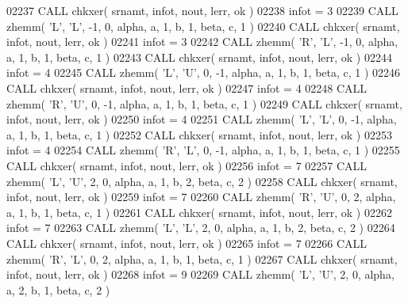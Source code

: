 \begin{DoxyCode}
02237       \textcolor{keyword}{CALL }chkxer( srnamt, infot, nout, lerr, ok )
02238       infot = 3
02239       \textcolor{keyword}{CALL }zhemm( \textcolor{stringliteral}{'L'}, \textcolor{stringliteral}{'L'}, -1, 0, alpha, a, 1, b, 1, beta, c, 1 )
02240       \textcolor{keyword}{CALL }chkxer( srnamt, infot, nout, lerr, ok )
02241       infot = 3
02242       \textcolor{keyword}{CALL }zhemm( \textcolor{stringliteral}{'R'}, \textcolor{stringliteral}{'L'}, -1, 0, alpha, a, 1, b, 1, beta, c, 1 )
02243       \textcolor{keyword}{CALL }chkxer( srnamt, infot, nout, lerr, ok )
02244       infot = 4
02245       \textcolor{keyword}{CALL }zhemm( \textcolor{stringliteral}{'L'}, \textcolor{stringliteral}{'U'}, 0, -1, alpha, a, 1, b, 1, beta, c, 1 )
02246       \textcolor{keyword}{CALL }chkxer( srnamt, infot, nout, lerr, ok )
02247       infot = 4
02248       \textcolor{keyword}{CALL }zhemm( \textcolor{stringliteral}{'R'}, \textcolor{stringliteral}{'U'}, 0, -1, alpha, a, 1, b, 1, beta, c, 1 )
02249       \textcolor{keyword}{CALL }chkxer( srnamt, infot, nout, lerr, ok )
02250       infot = 4
02251       \textcolor{keyword}{CALL }zhemm( \textcolor{stringliteral}{'L'}, \textcolor{stringliteral}{'L'}, 0, -1, alpha, a, 1, b, 1, beta, c, 1 )
02252       \textcolor{keyword}{CALL }chkxer( srnamt, infot, nout, lerr, ok )
02253       infot = 4
02254       \textcolor{keyword}{CALL }zhemm( \textcolor{stringliteral}{'R'}, \textcolor{stringliteral}{'L'}, 0, -1, alpha, a, 1, b, 1, beta, c, 1 )
02255       \textcolor{keyword}{CALL }chkxer( srnamt, infot, nout, lerr, ok )
02256       infot = 7
02257       \textcolor{keyword}{CALL }zhemm( \textcolor{stringliteral}{'L'}, \textcolor{stringliteral}{'U'}, 2, 0, alpha, a, 1, b, 2, beta, c, 2 )
02258       \textcolor{keyword}{CALL }chkxer( srnamt, infot, nout, lerr, ok )
02259       infot = 7
02260       \textcolor{keyword}{CALL }zhemm( \textcolor{stringliteral}{'R'}, \textcolor{stringliteral}{'U'}, 0, 2, alpha, a, 1, b, 1, beta, c, 1 )
02261       \textcolor{keyword}{CALL }chkxer( srnamt, infot, nout, lerr, ok )
02262       infot = 7
02263       \textcolor{keyword}{CALL }zhemm( \textcolor{stringliteral}{'L'}, \textcolor{stringliteral}{'L'}, 2, 0, alpha, a, 1, b, 2, beta, c, 2 )
02264       \textcolor{keyword}{CALL }chkxer( srnamt, infot, nout, lerr, ok )
02265       infot = 7
02266       \textcolor{keyword}{CALL }zhemm( \textcolor{stringliteral}{'R'}, \textcolor{stringliteral}{'L'}, 0, 2, alpha, a, 1, b, 1, beta, c, 1 )
02267       \textcolor{keyword}{CALL }chkxer( srnamt, infot, nout, lerr, ok )
02268       infot = 9
02269       \textcolor{keyword}{CALL }zhemm( \textcolor{stringliteral}{'L'}, \textcolor{stringliteral}{'U'}, 2, 0, alpha, a, 2, b, 1, beta, c, 2 )

\end{DoxyCode}
